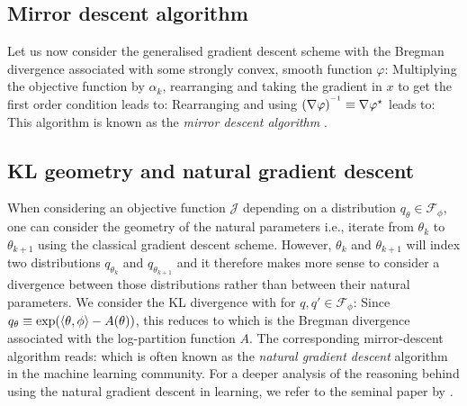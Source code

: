 \subsection{Mirror descent algorithm}
Let us now consider the generalised gradient descent scheme with the Bregman divergence associated with some strongly convex, smooth function $\varphi$:
Multiplying the objective function by $\alpha_{k}$, rearranging and taking the gradient in $x$ to get the first order condition leads to:
Rearranging and using $(\nabla \varphi)^{^{-1}}\equiv \nabla \varphi^{\star}$ leads to:
This algorithm is known as the \emph{mirror descent algorithm} \citep{beck03}. 

\subsection{KL geometry and natural gradient descent}
When considering an objective function $\mathcal J$ depending on a distribution $q_{\theta}\in\mathcal F_{\phi}$, one can consider the geometry of the natural parameters i.e., iterate from $\theta_{k}$ to $\theta_{k+1}$ using the classical gradient descent scheme. However, $\theta_{k}$ and $\theta_{k+1}$ will index two distributions $q_{\theta_{k}}$ and $q_{\theta_{k+1}}$ and it therefore makes more sense to consider a divergence between those distributions rather than between their natural parameters. 
We consider the KL divergence with for $q,q'\in\mathcal F_{\phi}$:
Since $q_{\theta}\equiv\exp(\left\langle \theta,\phi \right\rangle-A(\theta))$, this reduces to
which is the Bregman divergence associated with the log-partition function $A$. The corresponding mirror-descent algorithm reads:
which is often known as the \emph{natural gradient descent} algorithm in the machine learning community. 
For a deeper analysis of the reasoning behind using the natural gradient descent in learning, we refer to the seminal paper by \citet{amari98}.
